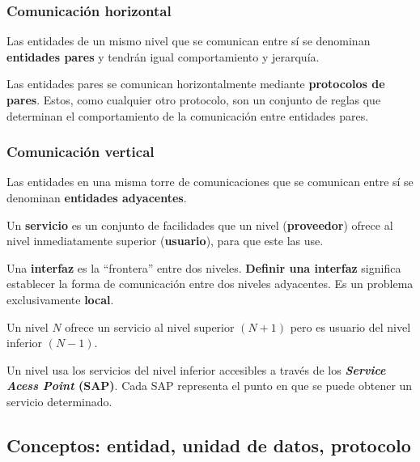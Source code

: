 \documentclass[a4paper]{book}
\numberwithin{figure}{chapter}
\numberwithin{equation}{subsection}
\begin{document}
\begin{multicols}{2}
  \subsubsection{Comunicación horizontal}
  Las entidades de un mismo nivel que se comunican entre sí se denominan \textbf{entidades pares} y tendrán igual comportamiento y jerarquía.

  Las entidades pares se comunican horizontalmente mediante \textbf{protocolos de pares}. Estos, como cualquier otro protocolo, son un conjunto de reglas que determinan el comportamiento de la comunicación entre entidades pares.
  \columnbreak
  \subsubsection{Comunicación vertical}
  Las entidades en una misma torre de comunicaciones que se comunican entre sí se denominan \textbf{entidades adyacentes}.

  Un \textbf{servicio} es un conjunto de facilidades que un nivel (\textbf{proveedor}) ofrece al nivel inmediatamente superior (\textbf{usuario}), para que este las use.

  Una \textbf{interfaz} es la ``frontera'' entre dos niveles. \textbf{Definir una interfaz} significa establecer la forma de comunicación entre dos niveles adyacentes. Es un problema exclusivamente \textbf{local}.

  Un nivel $N$ ofrece un servicio al nivel superior $(N+1)$ pero es usuario del nivel inferior $(N-1)$.

  Un nivel usa los servicios del nivel inferior accesibles a través de los \textbf{\textsl{Service Acess Point} (SAP)}. Cada SAP representa el punto en que se puede obtener un servicio determinado.
\end{multicols}

\subsection{Conceptos: entidad, unidad de datos, protocolo}
\end{document}
